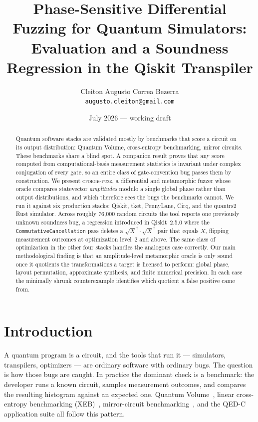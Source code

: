 \documentclass[11pt]{article}
\title{Phase-Sensitive Differential Fuzzing for Quantum Simulators:\\
Evaluation and a Soundness Regression in the Qiskit Transpiler}
\author{Cleiton Augusto Correa Bezerra\\
\small \texttt{augusto.cleiton@gmail.com}}
\date{July 2026 --- working draft}
\newcommand{\tool}{\textsc{cforge-fuzz}}
\begin{document}
\maketitle

\begin{abstract}
Quantum software stacks are validated mostly by benchmarks that score a
circuit on its output distribution: Quantum Volume, cross-entropy
benchmarking, mirror circuits. These benchmarks share a blind spot. A
companion result proves that any score computed from computational-basis
measurement statistics is invariant under complex conjugation of every
gate, so an entire class of gate-convention bug passes them by
construction. We present \tool{}, a differential and metamorphic fuzzer
whose oracle compares statevector \emph{amplitudes} modulo a single
global phase rather than output distributions, and which therefore sees
the bugs the benchmarks cannot. We run it against six production stacks:
Qiskit, tket, PennyLane, Cirq, and the quantrs2 Rust simulator. Across
roughly 76{,}000 random circuits the tool reports one previously unknown
soundness bug, a regression introduced in Qiskit~2.5.0 where the
\texttt{CommutativeCancellation} pass deletes a
$\sqrt{X}^\dagger\!\cdot\sqrt{X}^\dagger$ pair that equals $X$, flipping
measurement outcomes at optimization level~2 and above. The same class
of optimization in the other four stacks handles the analogous case
correctly. Our main methodological finding is that an amplitude-level
metamorphic oracle is only sound once it quotients the transformations a
target is licensed to perform: global phase, layout permutation,
approximate synthesis, and finite numerical precision. In each case the
minimally shrunk counterexample identifies which quotient a false
positive came from.
\end{abstract}

\section{Introduction}

A quantum program is a circuit, and the tools that run it --- simulators,
transpilers, optimizers --- are ordinary software with ordinary bugs. The
question is how those bugs are caught. In practice the dominant check is
a benchmark: the developer runs a known circuit, samples measurement
outcomes, and compares the resulting histogram against an expected one.
Quantum Volume~\cite{cross2019}, linear cross-entropy benchmarking
(XEB)~\cite{arute2019}, mirror-circuit benchmarking~\cite{proctor2022},
and the QED-C application suite all follow this pattern.
\end{document}
